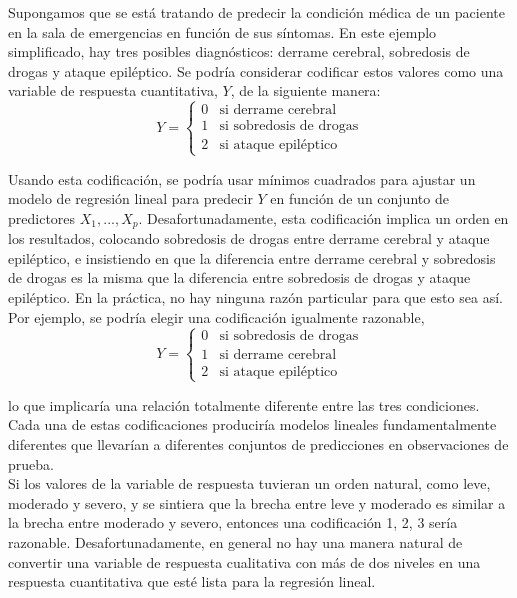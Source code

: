 Supongamos que se está tratando de predecir la condición médica de un paciente en la sala de emergencias en función de sus síntomas. En este ejemplo simplificado, hay tres posibles diagnósticos: derrame cerebral, sobredosis de drogas y ataque epiléptico. Se podría considerar codificar estos valores como una variable de respuesta cuantitativa, $Y$, de la siguiente manera:
\begin{equation*}
Y = 
\begin{cases} 
0 & \text{si derrame cerebral} \\
1 & \text{si sobredosis de drogas} \\
2 & \text{si ataque epiléptico}
\end{cases}
\end{equation*}

Usando esta codificación, se podría usar mínimos cuadrados para ajustar un modelo de regresión lineal para predecir $Y$ en función de un conjunto de predictores $X_1,...,X_p$. Desafortunadamente, esta codificación implica un orden en los resultados, colocando sobredosis de drogas entre derrame cerebral y ataque epiléptico, e insistiendo en que la diferencia entre derrame cerebral y sobredosis de drogas es la misma que la diferencia entre sobredosis de drogas y ataque epiléptico. En la práctica, no hay ninguna razón particular para que esto sea así. Por ejemplo, se podría elegir una codificación igualmente razonable,
\begin{equation*}
Y = 
\begin{cases} 
0 & \text{si sobredosis de drogas} \\
1 & \text{si derrame cerebral} \\
2 & \text{si ataque epiléptico}
\end{cases}
\end{equation*}

lo que implicaría una relación totalmente diferente entre las tres condiciones. Cada una de estas codificaciones produciría modelos lineales fundamentalmente diferentes que llevarían a diferentes conjuntos de predicciones en observaciones de prueba. \\

Si los valores de la variable de respuesta tuvieran un orden natural, como leve, moderado y severo, y se sintiera que la brecha entre leve y moderado es similar a la brecha entre moderado y severo, entonces una codificación 1, 2, 3 sería razonable. Desafortunadamente, en general no hay una manera natural de convertir una variable de respuesta cualitativa con más de dos niveles en una respuesta cuantitativa que esté lista para la regresión lineal. \\


